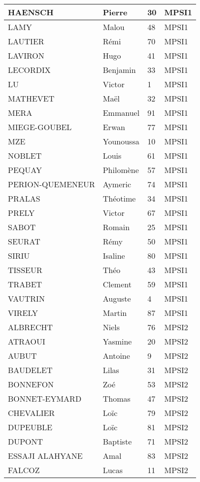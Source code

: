 \documentclass[francais,a4paper,div=19,12 pt]{scrartcl}
\begin{document}
\begin{center}
\begin{longtable}{|p{}|p{}|p{}|p{}|}
\hline
HAENSCH & Pierre & 30 & MPSI1\\
\hline
LAMY & Malou & 48 & MPSI1\\
\hline
LAUTIER & Rémi & 70 & MPSI1\\
\hline
LAVIRON & Hugo & 41 & MPSI1\\
\hline
LECORDIX & Benjamin & 33 & MPSI1\\
\hline
LU & Victor & 1 & MPSI1\\
\hline
MATHEVET & Maël & 32 & MPSI1\\
\hline
MERA & Emmanuel & 91 & MPSI1\\
\hline
MIEGE-GOUBEL & Erwan & 77 & MPSI1\\
\hline
MZE & Younoussa & 10 & MPSI1\\
\hline
NOBLET & Louis & 61 & MPSI1\\
\hline
PEQUAY & Philomène & 57 & MPSI1\\
\hline
PERION-QUEMENEUR & Aymeric & 74 & MPSI1\\
\hline
PRALAS & Théotime & 34 & MPSI1\\
\hline
PRELY & Victor & 67 & MPSI1\\
\hline
SABOT & Romain & 25 & MPSI1\\
\hline
SEURAT & Rémy & 50 & MPSI1\\
\hline
SIRIU & Isaline & 80 & MPSI1\\
\hline
TISSEUR & Théo & 43 & MPSI1\\
\hline
TRABET & Clement & 59 & MPSI1\\
\hline
VAUTRIN & Auguste & 4 & MPSI1\\
\hline
VIRELY & Martin & 87 & MPSI1\\
\hline
ALBRECHT  & Niels & 76 & MPSI2\\
\hline
ATRAOUI  & Yasmine & 20 & MPSI2\\
\hline
AUBUT  & Antoine & 9 & MPSI2\\
\hline
BAUDELET  & Lilas & 31 & MPSI2\\
\hline
BONNEFON  & Zoé & 53 & MPSI2\\
\hline
BONNET-EYMARD & Thomas & 47 & MPSI2\\
\hline
CHEVALIER  & Loïc & 79 & MPSI2\\
\hline
DUPEUBLE  & Loïc & 81 & MPSI2\\
\hline
DUPONT  & Baptiste & 71 & MPSI2\\
\hline
ESSAJI ALAHYANE  & Amal & 83 & MPSI2\\
\hline
FALCOZ  & Lucas & 11 & MPSI2\\

\end{longtable}
\end{center}
\end{document}
